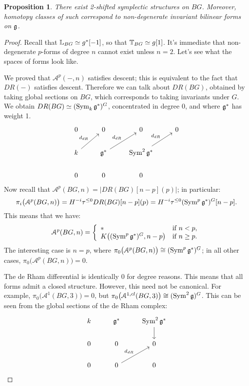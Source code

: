 \documentclass[10pt,a4paper,reqno,oneside]{book} %
\theoremstyle{plain}
\newtheorem{prop}[thm]{Proposition}
\theoremstyle{definition}
\theoremstyle{remark}
\numberwithin{equation}{section}
\begin{document}
\begin{prop}
There exist 2-shifted symplectic structures on $BG$. Moreover, homotopy classes of such correspond to non-degenerate 
invariant bilinear forms on $\mathfrak g$.
\end{prop}
\begin{proof}
Recall that $\mathbb L_{BG} \simeq g^* [-1]$, so that $\mathbb T_{BG} \simeq g[1]$. It's immediate that non-degenerate
$p$-forms of degree $n$ cannot exist unless $n=2$. Let's see what the spaces of forms look like.

We proved that $\mathcal{A}^p(-,n)$ satisfies descent; this is equivalent to the fact that $DR(-)$ satisfies descent.
Therefore we can talk about $DR(BG)$, obtained by taking global sections on $BG$, which corresponds to taking
invariants under $G$. We obtain $DR(BG) \simeq (\operatorname{Sym}_k \mathfrak g^*)^G$, concentrated
in degree 0, and where $\mathfrak g^*$ has weight 1.
\[
\begin{tikzcd}
0 & 0 & 0 & 0 \\
k\arrow{ur}{d_{dR}} & \fr g^*\arrow{ur}{d_{dR}} & \Sym^2 \fr g^*\arrow{ur}{d_{dR}} & \\
0 & 0 & 0 & 
\end{tikzcd}
\]
Now recall that $\mathcal{A}^p(BG,n) = |DR(BG)[n-p](p)|$; in particular:
\[	\pi_i\big(\mathcal{A}^p(BG,n)\big) = H^{-i} \tau^{\leq 0} DR(BG)[n-p](p) = H^{-i} \tau^{\leq 0} (\operatorname{Sym}^p \mathfrak g^*)^G [n-p]	.	\] 
This means that we have:
\begin{equation}
\label{eq:desc_forms}
	\mathcal{A}^p(BG,n) = 
\left\{ \begin{array} {ll} * & \text{if } n<p,  \\ 
K\big((\operatorname{Sym}^p \mathfrak g^*)^G, n-p\big) & \text{if } n\geq p .  \end{array} \right.
\end{equation}
The interesting case is $n=p$, where $\pi_0\big(\mathcal{A}^p(BG,n)\big) \cong (\operatorname{Sym}^p \mathfrak g^*)^G$; in all other cases,
$\pi_0\big(\mathcal{A}^p(BG,n)\big) = 0$.

The de Rham differential is identically 0 for degree reasons. This means that all forms admit a closed structure. However, this
need not be canonical. For example, $\pi_0\big(\mathcal{A}^1(BG,3)\big) = 0$, but $\pi_0\big(\mathcal{A}^{1,cl}(BG,3)\big) \cong 
(\operatorname{Sym}^2 \mathfrak g)^G$. This can be seen from the global sections of the de Rham complex:
\[
\begin{tikzcd}
k & \fr g^* & \Sym^2 \fr g^*\arrow{d} \\
0 & 0 & 0 \\
0 & 0\arrow{ur}{d_{dR}} & 0 
\end{tikzcd}
\]


\end{proof}
\end{document}
